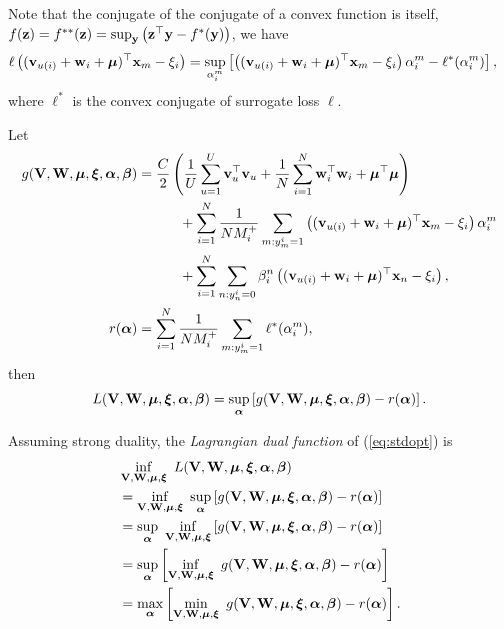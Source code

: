 Note that the conjugate of the conjugate of a convex function is itself, \ie $f(\mathbf{z}) = f^{**}(\mathbf{z}) = \sup_{\mathbf{y}} \left(\mathbf{z}^\top \mathbf{y} - f^*(\mathbf{y}) \right)$, we have
\begin{equation*}
\begin{aligned}
\ell \left( (\mathbf{v}_{u(i)} + \mathbf{w}_i + \bm{\mu})^\top \mathbf{x}_m - \xi_i \right)
&= \sup_{\alpha_i^m} \left[ \left( (\mathbf{v}_{u(i)} + \mathbf{w}_i + \bm{\mu})^\top \mathbf{x}_m - \xi_i \right) \alpha_i^m - \ell^*(\alpha_i^m) \right],
\end{aligned}
\end{equation*}
where $\ell^*$ is the convex conjugate of surrogate loss $\ell$.

Let
\begin{equation*}
\begin{aligned}
g(\mathbf{V}, \mathbf{W}, \bm{\mu}, \bm{\xi}, {\bm{\alpha}}, {\bm{\beta}})
&= \frac{C}{2} \left( \frac{1}{U} \sum_{u=1}^U \mathbf{v}_u^\top \mathbf{v}_u 
     + \frac{1}{N} \sum_{i=1}^N \mathbf{w}_i^\top \mathbf{w}_i + \bm{\mu}^\top \bm{\mu} \right) \\
& \hspace{3em}
     + \sum_{i=1}^N \frac{1}{N M_i^+} \sum_{m: y_m^i = 1} \left( (\mathbf{v}_{u(i)} + \mathbf{w}_i + \bm{\mu})^\top \mathbf{x}_m - \xi_i \right) \alpha_i^m \\
& \hspace{3em}
     + \sum_{i=1}^N \sum_{n: y_n^i = 0} \beta_i^n \left( (\mathbf{v}_{u(i)} + \mathbf{w}_i + \bm{\mu})^\top \mathbf{x}_n - \xi_i \right), \\
r({\bm{\alpha}})
&= \sum_{i=1}^N \frac{1}{N M_i^+} \sum_{m: y_m^i = 1} \ell^*(\alpha_i^m),
\end{aligned}
\end{equation*}
then 
\begin{equation*}
\begin{aligned}
L(\mathbf{V}, \mathbf{W}, \bm{\mu}, \bm{\xi}, {\bm{\alpha}}, {\bm{\beta}}) 
= \sup_{\bm{\alpha}} \left[ g(\mathbf{V}, \mathbf{W}, \bm{\mu}, \bm{\xi}, {\bm{\alpha}}, {\bm{\beta}}) - r({\bm{\alpha}}) \right].
\end{aligned}
\end{equation*}

Assuming strong duality, the \emph{Lagrangian dual function} of (\ref{eq:stdopt}) is
\begin{equation}
\label{eq:dualfunc}
\begin{aligned}
&\inf_{\mathbf{V}, \mathbf{W}, \bm{\mu}, \bm{\xi}} \ L(\mathbf{V}, \mathbf{W}, \bm{\mu}, \bm{\xi}, {\bm{\alpha}}, {\bm{\beta}}) \\
&= \inf_{\mathbf{V}, \mathbf{W}, \bm{\mu}, \bm{\xi}} \ \sup_{\bm{\alpha}} \left[ g(\mathbf{V}, \mathbf{W}, \bm{\mu}, \bm{\xi}, {\bm{\alpha}}, {\bm{\beta}}) - r({\bm{\alpha}}) \right] \\
&= \sup_{\bm{\alpha}} \ \inf_{\mathbf{V}, \mathbf{W}, \bm{\mu}, \bm{\xi}} \left[ g(\mathbf{V}, \mathbf{W}, \bm{\mu}, \bm{\xi}, {\bm{\alpha}}, {\bm{\beta}}) - r({\bm{\alpha}}) \right] \\
&= \sup_{\bm{\alpha}} \left[ \inf_{\mathbf{V}, \mathbf{W}, \bm{\mu}, \bm{\xi}} \ g(\mathbf{V}, \mathbf{W}, \bm{\mu}, \bm{\xi}, {\bm{\alpha}}, {\bm{\beta}}) - r({\bm{\alpha}}) \right] \\
&= \max_{\bm{\alpha}} \left[ \min_{\mathbf{V}, \mathbf{W}, \bm{\mu}, \bm{\xi}} \ g(\mathbf{V}, \mathbf{W}, \bm{\mu}, \bm{\xi}, {\bm{\alpha}}, {\bm{\beta}}) - r({\bm{\alpha}}) \right].
\end{aligned}
\end{equation}

